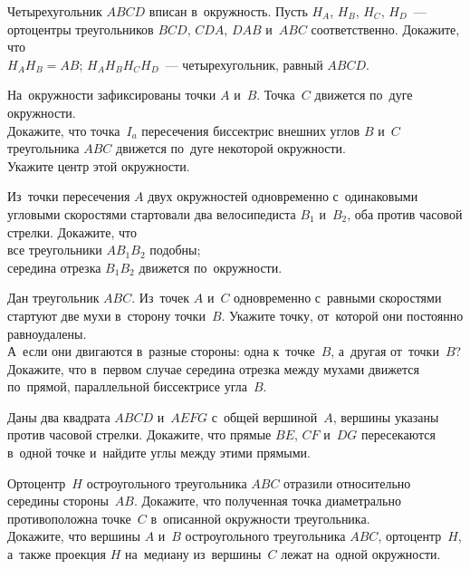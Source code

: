 


\begin{problems}

\item
Четырехугольник $ABCD$ вписан в~окружность.
Пусть $H_A$, $H_B$, $H_C$, $H_D$~--- ортоцентры треугольников
$BCD$, $CDA$, $DAB$ и~$ABC$ соответственно.
Докажите, что
\\
\subproblem $H_A H_B = AB$;
\qquad
\subproblem $H_A H_B H_C H_D$~--- четырехугольник, равный $ABCD$.

\item
На~окружности зафиксированы точки $A$ и~$B$.
Точка~$C$ движется по~дуге окружности.
\\
\subproblem
Докажите, что точка~$I_a$ пересечения биссектрис внешних углов $B$ и~$C$
треугольника $ABC$ движется по~дуге некоторой окружности.
\\
\subproblem
Укажите центр этой окружности.

\item
Из~точки пересечения $A$ двух окружностей одновременно с~одинаковыми угловыми
скоростями стартовали два велосипедиста $B_1$ и~$B_2$, оба против часовой
стрелки.
Докажите, что
\\
\subproblem
все треугольники $A B_1 B_2$ подобны;
\\
\subproblem
середина отрезка $B_1 B_2$ движется по~окружности.

\item
\subproblem
Дан треугольник $ABC$.
Из~точек $A$ и~$C$ одновременно с~равными скоростями стартуют две мухи
в~сторону точки~$B$.
Укажите точку, от~которой они постоянно равноудалены.
\\
\subproblem
А~если они двигаются в~разные стороны: одна к~точке~$B$, а~другая от~точки~$B$?
\\
\subproblem
Докажите, что в~первом случае середина отрезка между мухами движется по~прямой,
параллельной биссектрисе угла~$B$.

\item
Даны два квадрата $ABCD$ и~$AEFG$ с~общей вершиной~$A$, вершины указаны против
часовой стрелки.
Докажите, что прямые $BE$, $CF$ и~$DG$ пересекаются в~одной точке и~найдите
углы между этими прямыми.

\item
\subproblem
Ортоцентр~$H$ остроугольного треугольника $ABC$ отразили относительно середины
стороны~$AB$.
Докажите, что полученная точка диаметрально противоположна точке~$C$
в~описанной окружности треугольника.
\\
\subproblem
Докажите, что вершины $A$ и~$B$ остроугольного треугольника $ABC$,
ортоцентр~$H$, а~также проекция $H$ на~медиану из~вершины~$C$ лежат на~одной
окружности.

\end{problems}


